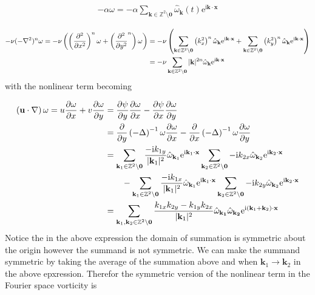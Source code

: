 \documentclass[9pt]{article}
\newcommand{\pder}[2]{\frac{\partial #1}{\partial #2}}               %
\newcommand{\ppder}[2]{\frac{\partial^2 #1}{\partial {#2}^2}}        %
\newcommand{\ii}{\mathrm{i}}      								  %
\newcommand{\e}{\mathrm{e}}      								  %
\newcommand{\bfu}{\mathbf{u}}											%
\newcommand{\omegahat}[1]{\hat{\omega}_{ \mathbf{#1} } }								%
\newcommand{\bfx}{\mathbf{x}}								%
\newcommand{\bfk}{\mathbf{k}}								%
\newcommand{\bfkn}[1]{\mathbf{k}_{#1}}								%
\begin{document}
\begin{align}
	-\alpha\omega = -\alpha \sum_{\mathbf{k}\in \mathbb{Z}^2\setminus \mathbf{0}}\hat{\omega}_{\mathbf{k}}(t)\e^{\ii \mathbf{k}\cdot \mathbf{x}}
\end{align}

\begin{align}
	- \nu (-\nabla^2)^n  \omega = - \nu \left(\left(\ppder{}{x}\right)^n\omega + \left(\ppder{}{y}^n\right)\omega\right) &= -\nu\left(\sum_{\mathbf{k}\in \mathbb{Z}^2\setminus \mathbf{0}} \left(k_x^2\right)^n\hat{\omega}_{\mathbf{k}}\e^{\ii \mathbf{k}\cdot \mathbf{x}} +\sum_{\mathbf{k}\in \mathbb{Z}^2\setminus \mathbf{0}} \left(k_y^2\right)^n\hat{\omega}_{\mathbf{k}}\e^{\ii \mathbf{k}\cdot \mathbf{x}} \right)\notag \\
	&= -\nu\sum_{\mathbf{k}\in \mathbb{Z}^2\setminus \mathbf{0}} |\bfk|^{2n}\hat{\omega}_{\mathbf{k}}\e^{\ii \mathbf{k}\cdot \mathbf{x}}
\end{align}
with the nonlinear term becoming 

\begin{align}
\left(\bfu \cdot \nabla\right) \omega	= u\pder{\omega}{x} + v\pder{\omega}{y} &= \pder{\psi}{y}\pder{\omega}{x} - \pder{\psi}{x}\pder{\omega}{y} \notag \\
&= \pder{}{y}\left(-\Delta\right)^{-1}\omega\pder{\omega}{x} - \pder{}{x}\left(-\Delta\right)^{-1}\omega\pder{\omega}{y} \notag \\
&= \sum_{\mathbf{k}_1\in \mathbb{Z}^2\setminus \mathbf{0}} \frac{-\ii k_{1y}}{|\bfkn{1}|^2}\hat{\omega}_{\bfkn{1}} \e^{\ii \bfkn{1}\cdot \mathbf{x}} \sum_{\mathbf{k}_2\in \mathbb{Z}^2\setminus \mathbf{0}} -\ii k_{2x}\hat{\omega}_{\bfkn{2}} \e^{\ii \bfkn{2}\cdot \mathbf{x}} \notag\\
&\qquad - \sum_{\mathbf{k}_1\in \mathbb{Z}^2\setminus \mathbf{0}} \frac{-\ii k_{1x}}{|\bfkn{1}|^2}\hat{\omega}_{\bfkn{1}} \e^{\ii \bfkn{1}\cdot \mathbf{x}} \sum_{\mathbf{k}_2\in \mathbb{Z}^2\setminus \mathbf{0}} -\ii k_{2y}\hat{\omega}_{\bfkn{2}} \e^{\ii \bfkn{2}\cdot \mathbf{x}} \notag \\
&= \sum_{\mathbf{k}_1, \mathbf{k}_2\in \mathbb{Z}^2\setminus \mathbf{0}}\frac{k_{1x}k_{2y} - k_{1y}k_{2x}}{|\bfkn{1}|^2} \omegahat{\bfkn{1}}\omegahat{\bfkn{2}} \e^{\ii (\bfkn{1} + \bfkn{2}) \cdot \bfx}
\end{align}
Notice the in the above expression the domain of summation is symmetric about the origin however the summand is not symmetric. We can make the summand symmetric by taking the average of the summation above and when $\bfkn{1} \rightarrow \bfkn{2}$ in the above epxression. Therefor the symmetric version of the nonlinear term in the Fourier space vorticity is
\end{document}
